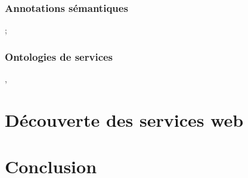 	\subsubsection{Annotations sémantiques};
	\subsubsection{Ontologies de services} 
	  \cite{mcguinness2004owl} , \cite{mcilraith2003bringing}

\section{Découverte des services web}

\section{Conclusion}
